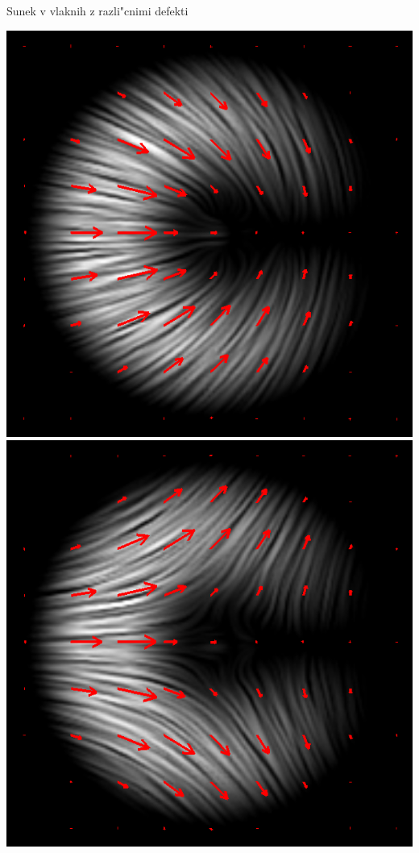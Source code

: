 \documentclass{beamer}
\begin{document}
\begin{frame}{Sunek v vlaknih z razli"cnimi defekti}
\begin{center}
  \includegraphics[height=.35\textheight]{./Slike/licp_p12_78} \quad
  \includegraphics[height=.35\textheight]{./Slike/licp_m12_78}
\end{center}

\end{frame}
\end{document}
